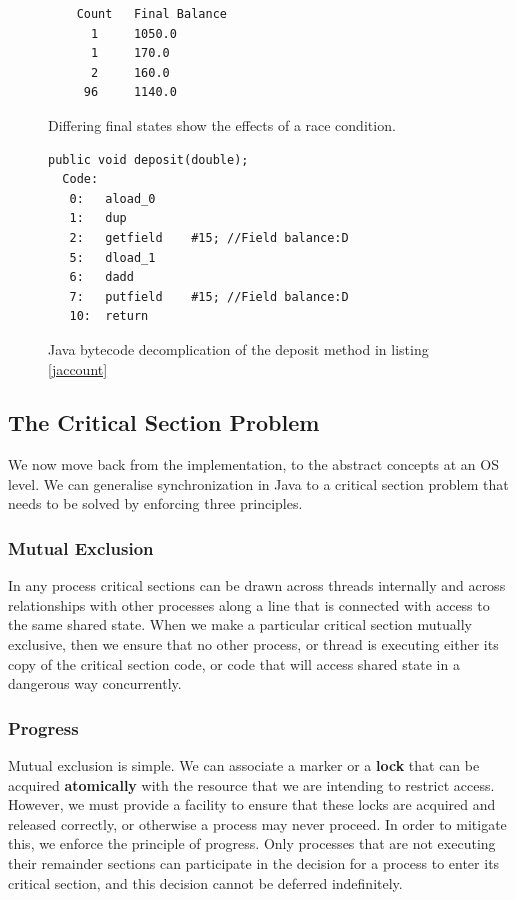 \documentclass[10pt,a4paper]{article}
\begin{document}
\begin{figure}
\caption{Differing final states show the effects of a race condition.}
\begin{center}
\begin{lstlisting}
	Count   Final Balance
      1 	1050.0
      1 	170.0
      2 	160.0
     96 	1140.0
\end{lstlisting}
\label{bad-results}
\end{center}
\end{figure}

\begin{figure}
\caption{Java bytecode decomplication of the deposit method in listing \ref{jaccount}}
\begin{center}
\begin{lstlisting}
public void deposit(double);
  Code:
   0:	aload_0
   1:	dup
   2:	getfield	#15; //Field balance:D
   5:	dload_1
   6:	dadd
   7:	putfield	#15; //Field balance:D
   10:	return
\end{lstlisting}
\label{byte-code}
\end{center}
\end{figure}

\subsection{The Critical Section Problem}
We now move back from the implementation, to the abstract concepts at an OS level. We can generalise synchronization in Java to a critical section problem that needs to be solved by enforcing three principles.  
\subsubsection{Mutual Exclusion}
In any process critical sections can be drawn across threads internally and across relationships with other processes along a line that is connected with access to the same shared state. When we make a particular critical section mutually exclusive, then we ensure that no other process, or thread is executing either its copy of the critical section code, or code that will access shared state in a dangerous way concurrently. 
\subsubsection{Progress}
Mutual exclusion is simple. We can associate a marker or a {\bf lock} that can be acquired {\bf atomically} with the resource that we are intending to restrict access. However, we must provide a facility to ensure that these locks are acquired and released correctly, or otherwise a process may never proceed. In order to mitigate this, we enforce the principle of progress. Only processes that are not executing their remainder sections can participate in the decision for a process to enter its critical section, and this decision cannot be deferred indefinitely. 
\end{document}
